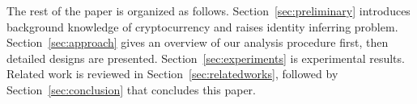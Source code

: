 

The rest of the paper is organized as follows. Section~\ref{sec:preliminary} introduces background knowledge of cryptocurrency and raises identity inferring problem. Section~\ref{sec:approach} gives an overview of our analysis procedure first, then detailed designs are presented. Section~\ref{sec:experiments} is experimental results.  Related work is reviewed in Section~\ref{sec:relatedworks}, followed by Section~\ref{sec:conclusion} that concludes this paper.




